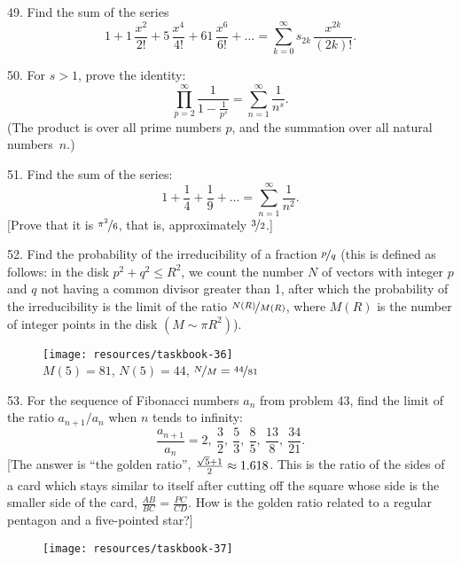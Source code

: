 \begin{problem}{49.}
Find the sum of the series
\begin{equation*}
	1+1\, \frac{x^2}{2!}+5\, \frac{x^4}{4!}+61\, \frac{x^6}{6!}+\dots=
	\textstyle\sum\limits_{k=0}^{\infty} s_{2k}\,\frac{x^{2k}}{(2k)!}.
\end{equation*}
\end{problem}

\begin{problem}{50.}
For $s>1$, prove the identity:
\begin{equation*}
	\textstyle\prod\limits_{p=2}^{\infty} \frac{1}{1-\frac{1}{p^s}}=\textstyle\sum\limits_{n=1}^{\infty} \frac{1}{n^s}.
\end{equation*}
(The product is over all prime numbers $p$, and the summation over all natural numbers~$n$.)
\end{problem}

\begin{problem}{51.}
Find the sum of the series:
\begin{equation*}
	1+ \frac{1}{4}+ \frac{1}{9}+\dots=\textstyle\sum\limits_{n=1}^{\infty} \frac{1}{n^2}.
\end{equation*}
[Prove that it is $\nicefrac{\pi^2}{6}$, that is, approximately $\nicefrac{3}{2}$.]
\end{problem}

\begin{problem}{52.}
Find the probability of the irreducibility of a fraction $\nicefrac{p}{q}$ (this is defined as follows:
in the disk $p^2+q^2 \leqslant R^2$, we count the number $N$ of vectors with integer
$p$ and $q$ not having a common divisor greater than 1, after which the probability of the irreducibility is the
limit of the ratio $\nicefrac{N(R)}{M(R)}$, where $M(R)$ is the number of integer points in the disk $(M \sim \pi R^2)$).
\begin{figure}
	\texttt{[image: resources/taskbook-36]}\\
	\footnotesize $M(5)=81$, $N(5)=44$, $\nicefrac{N}{M} = \nicefrac{44}{81}$
\end{figure}
\end{problem}

\begin{problem}{53.}
For the sequence of Fibonacci numbers $a_n$ from problem 43, find the limit of the ratio
$a_{n+1}/a_n$ when $n$ tends to infinity:\vspace{2\jot}
\begin{equation*}
	\frac{a_{n+1}}{a_n}=2,\ \frac 32,\ \frac53, \ \frac85, \ \frac{13}8,
	\ \frac{34}{21}.
\end{equation*}
[The answer is \enquote{the golden ratio},
$\frac{\sqrt{5}+1}{2\vphantom)} \approx 1.618$. This is the ratio of the sides of a card which stays
similar to itself after cutting off the square whose side is the smaller side of the card,
$\frac{AB}{BC}=\frac{PC}{CD}$. How is the golden ratio related to a regular pentagon and a five-pointed star?]
\begin{figure}
	\texttt{[image: resources/taskbook-37]}
\end{figure}
\end{problem}

